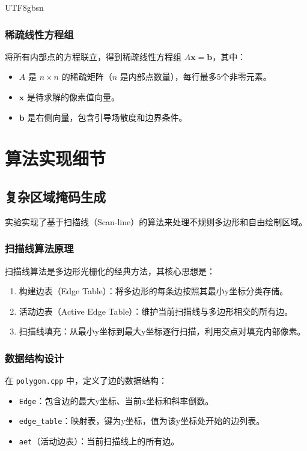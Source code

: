 \documentclass[11pt,a4paper]{article}
\begin{document}
\begin{CJK*}{UTF8}{gbsn}
\subsubsection{稀疏线性方程组}
将所有内部点的方程联立，得到稀疏线性方程组 $A\mathbf{x} = \mathbf{b}$，其中：
\begin{itemize}
    \item $A$ 是 $n \times n$ 的稀疏矩阵（$n$ 是内部点数量），每行最多5个非零元素。
    \item $\mathbf{x}$ 是待求解的像素值向量。
    \item $\mathbf{b}$ 是右侧向量，包含引导场散度和边界条件。
\end{itemize}

\section{算法实现细节}
\subsection{复杂区域掩码生成}
实验实现了基于扫描线（Scan-line）的算法来处理不规则多边形和自由绘制区域。

\subsubsection{扫描线算法原理}
扫描线算法是多边形光栅化的经典方法，其核心思想是：
\begin{enumerate}
    \item 构建边表（Edge Table）：将多边形的每条边按照其最小y坐标分类存储。
    \item 活动边表（Active Edge Table）：维护当前扫描线与多边形相交的所有边。
    \item 扫描线填充：从最小y坐标到最大y坐标逐行扫描，利用交点对填充内部像素。
\end{enumerate}

\subsubsection{数据结构设计}
在 \texttt{polygon.cpp} 中，定义了边的数据结构：
\begin{itemize}
    \item \texttt{Edge}：包含边的最大y坐标、当前x坐标和斜率倒数。
    \item \texttt{edge\_table}：映射表，键为y坐标，值为该y坐标处开始的边列表。
    \item \texttt{aet}（活动边表）：当前扫描线上的所有边。
\end{itemize}


\end{CJK*}
\end{document}
